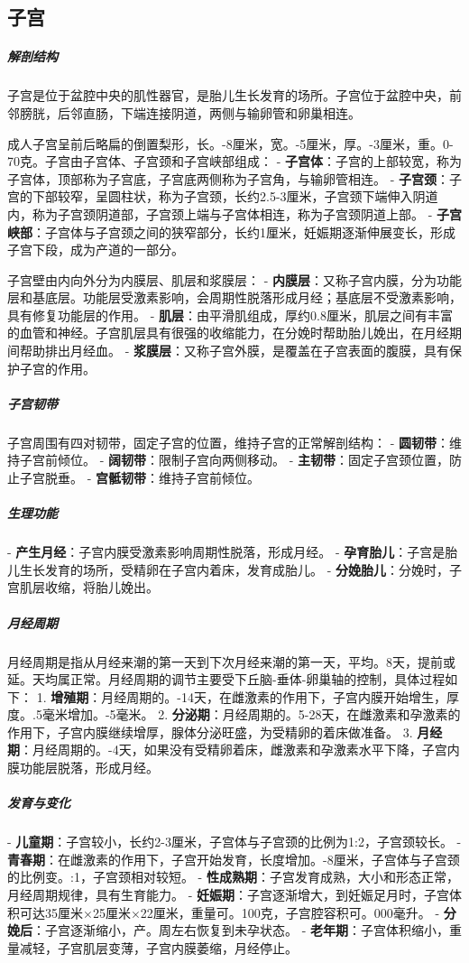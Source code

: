 \begin{enumerate}
\subsection{子宫}

\subparagraph{解剖结构}
子宫是位于盆腔中央的肌性器官，是胎儿生长发育的场所。子宫位于盆腔中央，前邻膀胱，后邻直肠，下端连接阴道，两侧与输卵管和卵巢相连。

成人子宫呈前后略扁的倒置梨形，长。-8厘米，宽。-5厘米，厚。-3厘米，重。0-70克。子宫由子宫体、子宫颈和子宫峡部组成：
- \textbf{子宫体}：子宫的上部较宽，称为子宫体，顶部称为子宫底，子宫底两侧称为子宫角，与输卵管相连。
- \textbf{子宫颈}：子宫的下部较窄，呈圆柱状，称为子宫颈，长约2.5-3厘米，子宫颈下端伸入阴道内，称为子宫颈阴道部，子宫颈上端与子宫体相连，称为子宫颈阴道上部。
- \textbf{子宫峡部}：子宫体与子宫颈之间的狭窄部分，长约1厘米，妊娠期逐渐伸展变长，形成子宫下段，成为产道的一部分。

子宫壁由内向外分为内膜层、肌层和浆膜层：
- \textbf{内膜层}：又称子宫内膜，分为功能层和基底层。功能层受激素影响，会周期性脱落形成月经；基底层不受激素影响，具有修复功能层的作用。
- \textbf{肌层}：由平滑肌组成，厚约0.8厘米，肌层之间有丰富的血管和神经。子宫肌层具有很强的收缩能力，在分娩时帮助胎儿娩出，在月经期间帮助排出月经血。
- \textbf{浆膜层}：又称子宫外膜，是覆盖在子宫表面的腹膜，具有保护子宫的作用。

\subparagraph{子宫韧带}
子宫周围有四对韧带，固定子宫的位置，维持子宫的正常解剖结构：
- \textbf{圆韧带}：维持子宫前倾位。
- \textbf{阔韧带}：限制子宫向两侧移动。
- \textbf{主韧带}：固定子宫颈位置，防止子宫脱垂。
- \textbf{宫骶韧带}：维持子宫前倾位。

\subparagraph{生理功能}
- \textbf{产生月经}：子宫内膜受激素影响周期性脱落，形成月经。
- \textbf{孕育胎儿}：子宫是胎儿生长发育的场所，受精卵在子宫内着床，发育成胎儿。
- \textbf{分娩胎儿}：分娩时，子宫肌层收缩，将胎儿娩出。

\subparagraph{月经周期}
月经周期是指从月经来潮的第一天到下次月经来潮的第一天，平均。8天，提前或延。天均属正常。月经周期的调节主要受下丘脑-垂体-卵巢轴的控制，具体过程如下：
1. \textbf{增殖期}：月经周期的。-14天，在雌激素的作用下，子宫内膜开始增生，厚度。.5毫米增加。-5毫米。
2. \textbf{分泌期}：月经周期的。5-28天，在雌激素和孕激素的作用下，子宫内膜继续增厚，腺体分泌旺盛，为受精卵的着床做准备。
3. \textbf{月经期}：月经周期的。-4天，如果没有受精卵着床，雌激素和孕激素水平下降，子宫内膜功能层脱落，形成月经。

\subparagraph{发育与变化}
- \textbf{儿童期}：子宫较小，长约2-3厘米，子宫体与子宫颈的比例为1:2，子宫颈较长。
- \textbf{青春期}：在雌激素的作用下，子宫开始发育，长度增加。-8厘米，子宫体与子宫颈的比例变。:1，子宫颈相对较短。
- \textbf{性成熟期}：子宫发育成熟，大小和形态正常，月经周期规律，具有生育能力。
- \textbf{妊娠期}：子宫逐渐增大，到妊娠足月时，子宫体积可达35厘米×25厘米×22厘米，重量可。100克，子宫腔容积可。000毫升。
- \textbf{分娩后}：子宫逐渐缩小，产。周左右恢复到未孕状态。
- \textbf{老年期}：子宫体积缩小，重量减轻，子宫肌层变薄，子宫内膜萎缩，月经停止。


\end{enumerate}
